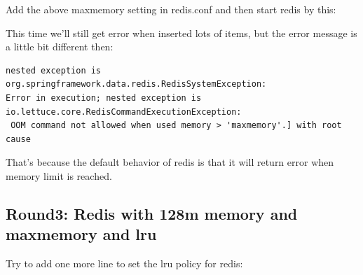 \documentclass[12pt]{article}
\begin{document}
\begin{Shaded}
\begin{Highlighting}[]
\end{Highlighting}
\end{Shaded}

Add the above maxmemory setting in redis.conf and then start redis by this:

\begin{Shaded}
\begin{Highlighting}[]
\DataTypeTok{\textbackslash{}}
           \DataTypeTok{\textbackslash{}}
            \DataTypeTok{\textbackslash{}}
           \DataTypeTok{\textbackslash{}}
           \OperatorTok{=} \DataTypeTok{\textbackslash{}}
           \DataTypeTok{\textbackslash{}}
\end{Highlighting}
\end{Shaded}

This time we'll still get error when inserted lots of items, but the error message is a little bit different then:

\begin{verbatim}
nested exception is org.springframework.data.redis.RedisSystemException: 
Error in execution; nested exception is io.lettuce.core.RedisCommandExecutionException:
 OOM command not allowed when used memory > 'maxmemory'.] with root cause
\end{verbatim}

That's because the default behavior of redis is that it will return error when memory limit is reached.

\subsection{Round3: Redis with 128m memory and maxmemory and lru}\label{round3-redis-with-128m-memory-and-maxmemory-and-lru}

Try to add one more line to set the lru policy for redis:

\begin{Shaded}
\begin{Highlighting}[]
\end{Highlighting}
\end{Shaded}
\end{document}
